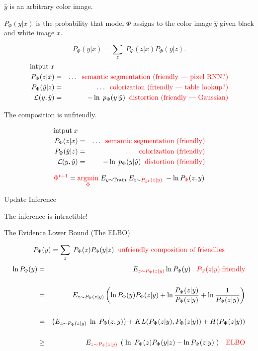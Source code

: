 {\vfill
$\hat{y}$ is an arbitrary color image.

\vfill
$P_\Phi(\hat{y}|x)$ is the probability that model $\Phi$ assigns to the color image $\hat{y}$ given black and white image $x$.


{\color{red} $$P_\Phi(y|x) = \sum_z\;P_\Phi(z|x)P_\Phi(y|z).$$}
\begin{eqnarray*}
\mbox{intput}\; x \\
P_\Phi(z|x) & = & \ldots \;\;\mbox{\color{red} semantic segmentation (friendly --- pixel RNN?)} \\
P_\Phi(\hat{y}|z) & = & \ldots \;\;\mbox{\color{red} colorization (friendly --- table lookup?)} \\
{\cal L}(y,\hat{y}) & = & -\ln\;p_\Phi(y|\hat{y}) \;\; \mbox{\color{red} distortion (friendly --- Gaussian)}
\end{eqnarray*}


\vfill
{\color{red} The composition is unfriendly.}


\begin{eqnarray*}
\mbox{intput}\; x \\
P_\Phi(z|x) & = & \ldots \;\;\mbox{\color{red} semantic segmentation (friendly)} \\
P_\Phi(\hat{y}|z) & = & \ldots \;\;\mbox{\color{red} colorization (friendly)} \\
{\cal L}(y,\hat{y}) & = & -\ln\;p_\Phi(y|\hat{y}) \;\; \mbox{\color{red} distortion (friendly)}
\end{eqnarray*}

$${\color{red} \Phi^{t+1}} =  {\color{red} \operatorname*{argmin}_\Phi}\;E_{y \sim \mathrm{Train}} \;E_{z \sim {\color{red} P_{\Phi^t}(z|y)}}\; - \ln P_{\color{red} \Phi}(z,y)$$
\centerline{\hspace{1em} Update \hspace{6em} Inference \hspace{2.5em}~}

\vfill
{\color{red} The inference is intractible!}

{The Evidence Lower Bound (The ELBO)}

$$P_\Phi(y) = \sum_z\;P_\Phi(z)P_\Phi(y|z)\;\;\mbox{\color{red} unfriendly composition of friendlies}$$
{\huge
\begin{eqnarray*}
\ln P_\Phi(y) & = & E_{\color{red} z \sim P_\Psi(z|y)} \ln P_\Phi(y) \;\;\;{\color{red} P_\Psi(z|y)\;\mbox{friendly}}\\
\\
 & = & E_{z \sim P_\Psi(z|y)} \left(\ln P_\Phi(y)P_\Phi(z|y) + \ln \frac{P_\Psi(z|y)}{P_\Phi(z|y)} + \ln\frac{1}{P_\Psi(z|y)}\right) \\
 \\
 & = & \left(E_{z \sim P_\Psi(z|y)} \;\ln\;P_\Phi(z,y)\right) + KL(P_\Psi(z|y),P_\Phi(z|y)) + H(P_\Psi(z|y)) \\
 \\
 & \geq & E_{\color{red} z \sim P_\Psi(z|y)}\;\left(\;\ln\;P_\Phi(z)P_\Phi(y|z) - \ln P_\Psi(z|y)\;\right) \;\;\;\mbox{\color{red} ELBO}
\end{eqnarray*}
}

}
